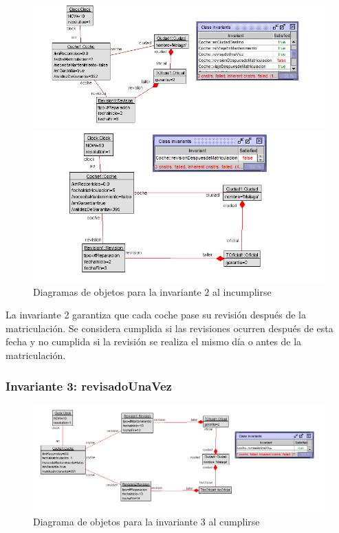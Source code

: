 \documentclass[12pt.a4paper]{article}
\begin{document}
\begin{figure}[H]
    \centering
    \begin{minipage}{0.49\textwidth}
        \centering
        \includegraphics[width=1\linewidth]{Soils/2.jpg}
    \end{minipage}
    \hfill
    \begin{minipage}{0.49\textwidth}
        \centering
        \includegraphics[width=1\linewidth]{Soils/2_v3.png}
    \end{minipage}
    \caption{Diagramas de objetos para la invariante 2 al incumplirse}
\end{figure}


La invariante 2 garantiza que cada coche pase su revisión después de la matriculación. Se considera cumplida si las revisiones ocurren después de esta fecha y no cumplida si la revisión se realiza el mismo día o antes de la matriculación.

\subsubsection{Invariante 3: revisadoUnaVez}
    \begin{figure}[H]
         \centering
         \includegraphics[width=1\linewidth]{Soils/3.png}
         \caption{Diagrama de objetos para la invariante 3 al cumplirse}
    \end{figure}
\end{document}
